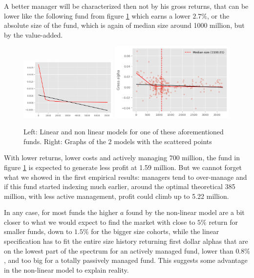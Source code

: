 \documentclass[12pt]{article}
\begin{document}
\par
A better manager will be characterized then not by his gross returns, that can be lower like the following fund from figure \ref{fig:fund109823} which earns a lower $2.7\%$, or the absolute size of the fund, which is again of median size around 1000 million, but by the value-added.


\begin{figure}[H]
    \centering
    \includegraphics[width=0.43\textwidth]{Fund109283.png}
    \includegraphics[width=0.55\textwidth]{Fund109283_scatter.png}
    \caption{Left: Linear and non linear models for one of these aforementioned funds. Right: Graphs of the 2 models with the scattered points}
    \label{fig:fund109823}
\end{figure}

With lower returns, lower costs and actively managing 700 million, the fund in figure \ref{fig:fund109823} is expected to generate less profit at 1.59 million. But we cannot forget what we showed in the first empirical results: managers tend to over-manage and if this fund started indexing much earlier, around the optimal theoretical 385 million, with less active management, profit could climb up to 5.22 million. 


\par
In any case, for most funds the higher $a$ found by the non-linear model are a bit closer to what we would expect to find the market with close to $5\% $ return for smaller funds, down to $1.5\%$ for the bigger size cohorts, while the linear specification has to fit the entire size history returning first dollar alphas that are on the lowest part of the spectrum for an actively managed fund, lower than $0.8\%$, and too big for a totally passively managed fund. This suggests some advantage in the non-linear model to explain reality.
\end{document}
